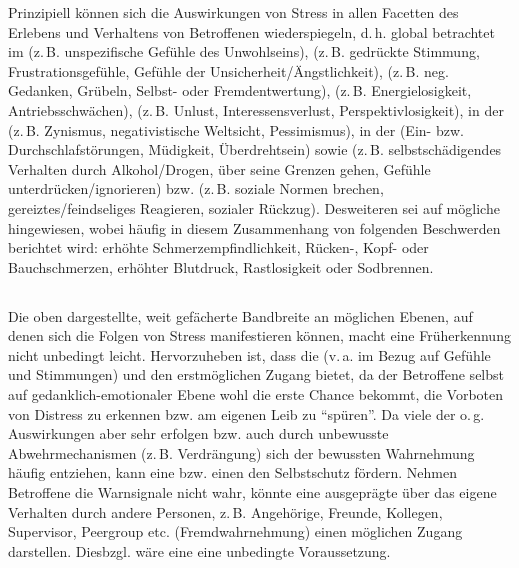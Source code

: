 \Text
{{\TxBeschreibung}}%
{%
Prinzipiell können sich die Auswirkungen von Stress in allen
Facetten des Erlebens und Verhaltens von Betroffenen
wiederspiegeln, d.\,h. global betrachtet im  (z.\,B. unspezifische Gefühle des
Unwohlseins),  (z.\,B. gedrückte
Stimmung, Frustrationsgefühle, Gefühle der
Unsicherheit/Ängstlichkeit), 
(z.\,B. neg. Gedanken, Grübeln, Selbst- oder
Fremdentwertung),  (z.\,B. Energielosigkeit,
Antriebsschwächen),  (z.\,B. Unlust,
Interessensverlust, Perspektivlosigkeit), in der
 (z.\,B.
Zynismus, negativistische Weltsicht, Pessimismus), in der
 (Ein- bzw. Durchschlafstörungen,
Müdigkeit, Überdrehtsein) sowie  (z.\,B. selbstschädigendes Verhalten durch
Alkohol/Drogen, über seine Grenzen gehen, Gefühle
unterdrücken/ignorieren) bzw.  (z.\,B. soziale Normen brechen,
gereiztes/feindseliges Reagieren, sozialer Rückzug).
Desweiteren sei auf mögliche 
hingewiesen, wobei häufig in diesem Zusammenhang von
folgenden Beschwerden berichtet wird: erhöhte
Schmerzempfindlichkeit, Rücken-, Kopf- oder Bauchschmerzen,
erhöhter Blutdruck, Rastlosigkeit oder Sodbrennen.
}%


\subsection{}
\label{topic:stressfrueherkennung-psi}

\Text
{{\TxBeschreibung}}%
{%
Die oben dargestellte, weit gefächerte Bandbreite an
möglichen Ebenen, auf denen sich die Folgen von Stress
manifestieren können, macht eine Früherkennung nicht
unbedingt leicht. Hervorzuheben ist, dass die  (v.\,a. im Bezug auf Gefühle und
Stimmungen) und  den erstmöglichen Zugang
bietet, da der Betroffene selbst auf gedanklich-emotionaler
Ebene wohl die erste Chance bekommt, die Vorboten von
Distress zu erkennen bzw. am eigenen Leib zu \enquote{spüren}. Da
viele der o.\,g. Auswirkungen aber sehr  erfolgen bzw. auch durch unbewusste
Abwehrmechanismen (z.\,B. Verdrängung) sich der bewussten
Wahrnehmung häufig entziehen, kann eine  bzw.  einen den
Selbstschutz fördern. Nehmen Betroffene die Warnsignale
nicht wahr, könnte eine ausgeprägte  über das eigene Verhalten durch andere Personen,
z.\,B. Angehörige, Freunde, Kollegen, Supervisor, Peergroup
etc. (Fremdwahrnehmung) einen möglichen Zugang darstellen.
Diesbzgl. wäre eine  eine
unbedingte Voraussetzung.
}%



